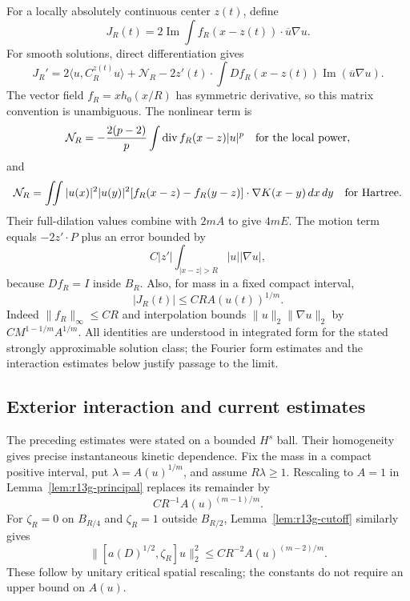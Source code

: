 For a locally absolutely continuous center $z(t)$, define
\[
 J_R(t)=2\operatorname{Im}\int f_R(x-z(t))\cdot\overline u\nabla u.
\]
For smooth solutions, direct differentiation gives
\begin{equation}\label{r13g:exact-moving-virial}
 J_R'=2\langle u,C_R^{z(t)}u\rangle+\mathcal N_R
 -2z'(t)\cdot\int Df_R(x-z(t))
                         \operatorname{Im}(\overline u\nabla u).
\end{equation}
The vector field $f_R=xh_0(x/R)$ has symmetric derivative, so this
matrix convention is unambiguous. The nonlinear term is
\[
 \mathcal N_R=-\frac{2(p-2)}p
       \int\operatorname{div}f_R(x-z)|u|^p
       \quad\hbox{for the local power},
\]
and
\[
 \mathcal N_R=\iint|u(x)|^2|u(y)|^2
  [f_R(x-z)-f_R(y-z)]\cdot\nabla K(x-y)\,dx\,dy
       \quad\hbox{for Hartree}.
\]
Their full-dilation values combine with $2mA$ to give $4mE$.
The motion term equals $-2z'\cdot P$ plus an error bounded by
\begin{equation}\label{r13g:motion-defect}
 C|z'|\int_{|x-z|>R}|u||\nabla u|,
\end{equation}
because $Df_R=I$ inside $B_R$. Also, for mass in a fixed compact
interval,
\begin{equation}\label{r13g:virial-endpoint}
 |J_R(t)|\le CR A(u(t))^{1/m}.
\end{equation}
Indeed $\|f_R\|_\infty\le CR$ and interpolation bounds
$\|u\|_2\|\nabla u\|_2$ by $CM^{1-1/m}A^{1/m}$.
All identities are understood in integrated form for the stated
strongly approximable solution class; the Fourier form estimates and
the interaction estimates below justify passage to the limit.

\subsection{Exterior interaction and current estimates}
\label{subsec:r13g-exterior-interaction}

The preceding estimates were stated on a bounded $H^s$ ball. Their
homogeneity gives precise instantaneous kinetic dependence. Fix the mass
in a compact positive interval, put $\lambda=A(u)^{1/m}$, and assume
$R\lambda\ge1$. Rescaling to $A=1$ in
Lemma~\ref{lem:r13g-principal} replaces its remainder by
\begin{equation}\label{r13g:scaled-principal-error}
 CR^{-1}A(u)^{(m-1)/m}.
\end{equation}
For $\zeta_R=0$ on $B_{R/4}$ and $\zeta_R=1$ outside $B_{R/2}$,
Lemma~\ref{lem:r13g-cutoff} similarly gives
\begin{equation}\label{r13g:scaled-cutoff-error}
 \|[a(D)^{1/2},\zeta_R]u\|_2^2
 \le CR^{-2}A(u)^{(m-2)/m}.
\end{equation}
These follow by unitary critical spatial rescaling; the constants do
not require an upper bound on $A(u)$.

